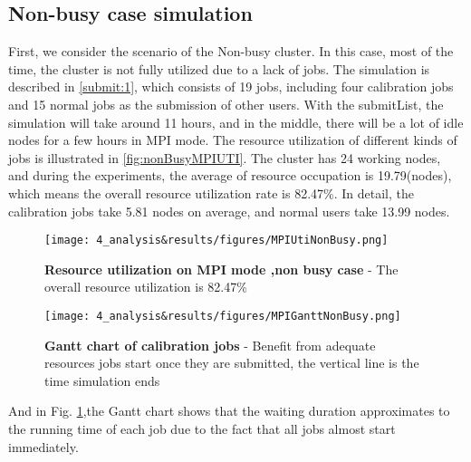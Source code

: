 \subsection{Non-busy case simulation }
First, we consider the scenario of the Non-busy cluster. In this case, most of the time, the cluster is not fully utilized due to a lack of jobs.
The simulation is described in \ref{submit:1}, which consists of 19 jobs, including four calibration jobs and 15 normal jobs as the submission of other users. 
With the submitList, the simulation will take around 11 hours, and in the middle, there will be a lot of idle nodes for a few hours in MPI mode. 
The resource utilization of different kinds of jobs is illustrated in \ref{fig:nonBusyMPIUTI}. The cluster has 24 working nodes, and during the experiments, the average of resource occupation is 19.79(nodes), which means the overall resource utilization rate is 82.47\%.
In detail, the calibration jobs take 5.81 nodes on average, and normal users take 13.99 nodes.
\begin{figure}
    \centering
    \begin{minipage}{.48\textwidth}
      \centering
      \texttt{[image: 4\_analysis\&results/figures/MPIUtiNonBusy.png]}
      \caption[Resource utilization on MPI mode ,non busy case]{{\small\textbf{Resource utilization on MPI mode ,non busy case} - The overall resource utilization is 82.47\%}}
      \label{fig:nonBusyMPIUTI}
    \end{minipage} 
    \begin{minipage}{.48\textwidth}
      \centering
      \texttt{[image: 4\_analysis\&results/figures/MPIGanttNonBusy.png]}
      \caption[Gantt chart of calibration jobs]{{\small\textbf{Gantt chart of calibration jobs} - Benefit from adequate resources jobs start once they are submitted, the vertical line is the time simulation ends }}
      \label{fig:nonBusyMPIgantt}
    \end{minipage}
\end{figure}
And in Fig. \ref{fig:nonBusyMPIgantt},the Gantt chart shows that the waiting duration approximates to the running time of each job due to the fact that all jobs almost start immediately.
